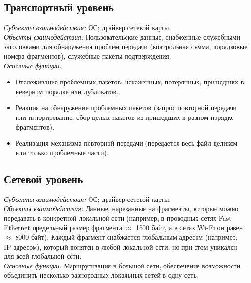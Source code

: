 \subsection{Транспортный уровень}
\emph{Субъекты взаимодействия:} ОС; драйвер сетевой карты.
\\\emph{Объекты взаимодействия:} Пользовательские данные, снабженные служебными заголовками для обнаружения проблем передачи (контрольная сумма, порядковые номера фрагментов), служебные пакеты-подтверждения.
\\\emph{Основные функции:}
\begin{itemize}
  \item Отслеживание проблемных пакетов: искаженных, потерянных, пришедших в неверном порядке или дубликатов.
  \item Реакция на обнаружение проблемных пакетов (запрос повторной передачи или игнорирование, сбор целых пакетов из пришедших в разном порядке фрагментов).
  \item Реализация механизма повторной передачи (передается весь файл целиком или только проблемные части).
\end{itemize}
\subsection{Сетевой уровень}
\emph{Субъекты взаимодействия:} ОС; драйвер сетевой карты.
\\\emph{Объекты взаимодействия:} Данные, нарезанные на фрагменты, которые можно передавать в конкретной локальной сети (например, в
проводных сетях Fast Ethernet предельный размер фрагмента $\approx$ 1500 байт, а в сетях Wi-Fi он равен $\approx$ 8000 байт). Каждый фрагмент снабжается глобальным адресом (например, IP-адресом), который понятен в любой локальной сети, но при этом уникален для всей
глобальной сети.
\\\emph{Основные функции:} Маршрутизация в большой сети; обеспечение возможности объединить несколько разнородных локальных сетей в одну сеть.

